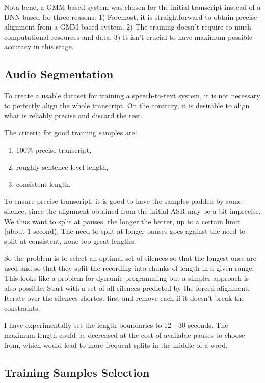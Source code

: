 \documentclass[conference]{IEEEtran}
\begin{document}
Nota bene, a GMM-based system was chosen for the initial transcript instead of
a DNN-based for three reasons: 1) Foremost, it is straightforward to obtain
precise alignment from a GMM-based system. 2) The training doesn't require so
much computational resources and data. 3) It isn't crucial to have maximum possible
accuracy in this stage.

\subsection{Audio Segmentation}

To create a usable dataset for training a speech-to-text system, it is not
necessary to perfectly align the whole transcript. On the contrary, it is
desirable to align what is reliably precise and discard the rest.

The criteria for good training samples are:
\begin{enumerate}
\item{100\% precise transcript,}
\item{roughly sentence-level length,}
\item{consistent length.}
\end{enumerate}

To ensure precise transcript, it is good to have the samples padded by some
silence, since the alignment obtained from the initial ASR may be a bit
imprecise. We thus want to split at pauses, the longer the better, up to a
certain limit (about 1 second). The need to split at longer
pauses goes against the need to split at consistent, none-too-great lengths.

So the problem is to select an optimal set of silences so that the longest ones
are used and so that they split the recording into chunks of length in a given
range. This looks like a problem for dynamic programming but a simpler approach
is also possible: Start with a set of all silences predicted by the forced
alignment.  Iterate over the silences shortest-first and remove each if it
doesn't break the constraints.

I have experimentally set the length boundaries to 12 - 30 seconds. The maximum
length could be decreased at the cost of available pauses to choose from, which
would lead to more frequent splits in the middle of a word.

\subsection{Training Samples Selection}
\end{document}
